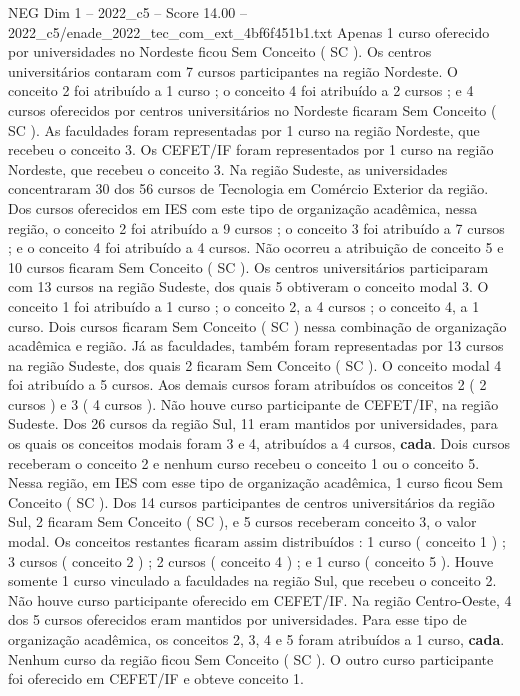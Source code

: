 \begin{textsample}{NEG Dim 1 – 2022\_c5 – Score 14.00 – 2022\_c5/enade\_2022\_tec\_com\_ext\_4bf6f451b1.txt}
Apenas 1 curso oferecido por universidades no Nordeste ficou Sem Conceito ( SC ).
Os centros universitários contaram com 7 cursos participantes na região Nordeste.
O conceito 2 foi atribuído a 1 curso ; o conceito 4 foi atribuído a 2 cursos ; e 4 cursos oferecidos por centros universitários no Nordeste ficaram Sem Conceito ( SC ).
As faculdades foram representadas por 1 curso na região Nordeste, que recebeu o conceito 3.
Os CEFET/IF foram representados por 1 curso na região Nordeste, que recebeu o conceito 3.
Na região Sudeste, as universidades concentraram 30 dos 56 cursos de Tecnologia em Comércio Exterior da região.
Dos cursos oferecidos em IES com este tipo de organização acadêmica, nessa região, o conceito 2 foi atribuído a 9 cursos ; o conceito 3 foi atribuído a 7 cursos ; e o conceito 4 foi atribuído a 4 cursos.
Não ocorreu a atribuição de conceito 5 e 10 cursos ficaram Sem Conceito ( SC ).
Os centros universitários participaram com 13 cursos na região Sudeste, dos quais 5 obtiveram o conceito modal 3.
O conceito 1 foi atribuído a 1 curso ; o conceito 2, a 4 cursos ; o conceito 4, a 1 curso.
Dois cursos ficaram Sem Conceito ( SC ) nessa combinação de organização acadêmica e região.
Já as faculdades, também foram representadas por 13 cursos na região Sudeste, dos quais 2 ficaram Sem Conceito ( SC ).
O conceito modal 4 foi atribuído a 5 cursos.
Aos demais cursos foram atribuídos os conceitos 2 ( 2 cursos ) e 3 ( 4 cursos ).
Não houve curso participante de CEFET/IF, na região Sudeste.
Dos 26 cursos da região Sul, 11 eram mantidos por universidades, para os quais os conceitos modais foram 3 e 4, atribuídos a 4 cursos, \textbf{cada}.
Dois cursos receberam o conceito 2 e nenhum curso recebeu o conceito 1 ou o conceito 5.
Nessa região, em IES com esse tipo de organização acadêmica, 1 curso ficou Sem Conceito ( SC ).
Dos 14 cursos participantes de centros universitários da região Sul, 2 ficaram Sem Conceito ( SC ), e 5 cursos receberam conceito 3, o valor modal.
Os conceitos restantes ficaram assim distribuídos : 1 curso ( conceito 1 ) ; 3 cursos ( conceito 2 ) ; 2 cursos ( conceito 4 ) ; e 1 curso ( conceito 5 ).
Houve somente 1 curso vinculado a faculdades na região Sul, que recebeu o conceito 2.
Não houve curso participante oferecido em CEFET/IF.
Na região Centro-Oeste, 4 dos 5 cursos oferecidos eram mantidos por universidades.
Para esse tipo de organização acadêmica, os conceitos 2, 3, 4 e 5 foram atribuídos a 1 curso, \textbf{cada}.
Nenhum curso da região ficou Sem Conceito ( SC ).
O outro curso participante foi oferecido em CEFET/IF e obteve conceito 1.

\end{textsample}
